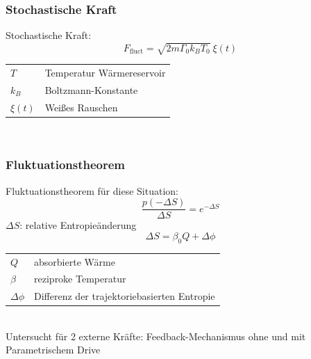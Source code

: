 \documentclass{beamer}
\begin{document}
\begin{frame}
\frametitle{Stochastische Kraft}
Stochastische Kraft:
\begin{equation}
    \label{eq:ffluct}
    F_\text{fluct} = \sqrt{2m\Gamma_0k_BT_0} \ \xi\left(t\right)
\end{equation}
\begin{tabular}{l l}
$T$ & Temperatur Wärmereservoir\\
$k_B$ & Boltzmann-Konstante\\
$\xi(t)$ & Weißes Rauschen\\
\end{tabular}\\
\end{frame}

\begin{frame}
\frametitle{Fluktuationstheorem}
Fluktuationstheorem für diese Situation:
\begin{equation}
    \label{eq:fluctuationtheorem}
    \frac{p(-\Delta S)}{\Delta S} = e^{-\Delta S}
\end{equation}
$\Delta S$: relative Entropieänderung
\begin{equation}
    \Delta S = \beta_0 Q + \Delta \phi
\end{equation}
\begin{tabular}{l l}
$Q$ & absorbierte Wärme\\
$\beta$ & reziproke Temperatur\\
$\Delta \phi$ & Differenz der trajektoriebasierten Entropie
\end{tabular}\\
Untersucht für 2 externe Kräfte: Feedback-Mechanismus ohne und mit Parametrischem Drive
\end{frame}
\end{document}
